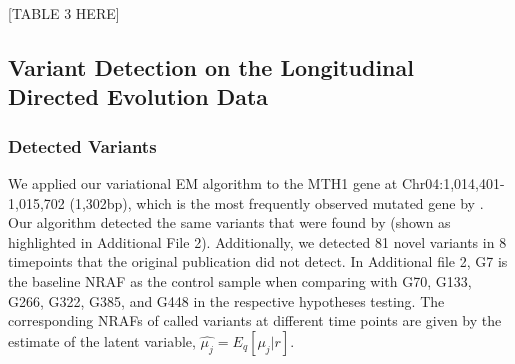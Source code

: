 \documentclass{bmcart}
\begin{document}

\vspace{2em}
\begin{center}
[TABLE 3 HERE]  
\end{center}
\vspace{2em}



\subsection{Variant Detection on the Longitudinal Directed Evolution Data}
\subsubsection{Detected Variants}
We applied our variational EM algorithm to the MTH1 gene at Chr04:1,014,401-1,015,702 (1,302bp), which is the most frequently observed mutated gene by \cite{kvitek2013whole}.
Our algorithm detected the same variants that were found by \cite{kvitek2013whole} (shown as highlighted in Additional File 2).
Additionally, we detected 81 novel variants in 8 timepoints that the original publication did not detect.
In Additional file 2, G7 is the baseline NRAF as the control sample when comparing with G70, G133, G266, G322, G385, and G448 in the respective hypotheses testing.
The corresponding NRAFs of called variants at different time points are given by the estimate of the latent variable, $\hat{\mu_j} = E_q[\mu_j|r]$.
\end{document}
